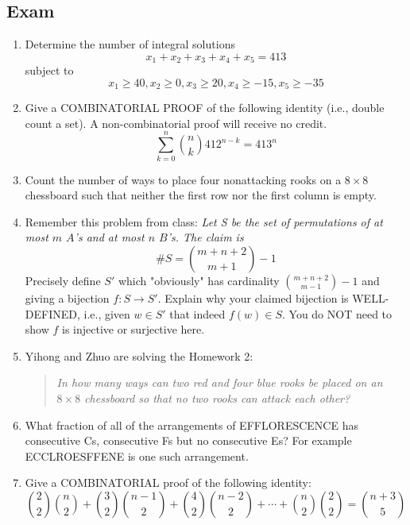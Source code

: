 \documentclass{report}
\begin{document}
{\subsection{Exam}

\begin{enumerate}
    \item Determine the number of integral solutions
          $$x_1 + x_2 + x_3 + x_4 + x_5 = 413$$ subject to
          $$x_1 \ge 40, x_2 \ge 0, x_3 \ge 20, x_4 \ge -15, x_5 \ge -35$$

    \item Give a COMBINATORIAL PROOF of the following identity (i.e.,
          double count a set). A non-combinatorial proof will receive no credit.
          $$\sum_{k=0}^n \binom{n}{k} 412^{n-k} = 413^n$$

    \item Count the number of ways to place four nonattacking rooks on a
          $8 \times 8$ chessboard such that neither the first row nor the first column is
          empty.

    \item Remember this problem from class: \textit{Let S be the set of permutations
              of at most $m$ $A$'s and at most $n$ $B$'s. The claim is}
          $$\#S = \binom{m+n+2}{m+1}-1 $$ Precisely define $S'$ which
          "obviously" has cardinality $\binom{m+n+2}{m-1}-1$ and giving a
          bijection $f: S \to S'$. Explain why your claimed bijection is
          WELL-DEFINED, i.e., given $w \in S'$ that indeed $f(w) \in S$.
          You do NOT need to show $f$ is injective or surjective here.

    \item Yihong and Zhuo are solving the Homework 2:

          \begin{quotation}
              \textit{In how many ways can two red and four blue rooks be
                  placed on an $8 \times 8$ chessboard so that no two rooks can
                  attack each other?}
          \end{quotation}

    \item What fraction of all of the arrangements of EFFLORESCENCE has
          consecutive Cs, consecutive Fs but no consecutive Es? For example
          ECCLROESFFENE is one such arrangement.

    \item Give a COMBINATORIAL proof of the following identity:
          $$\binom{2}{2}\binom{n}{2} + \binom{3}{2} \binom{n-1}{2} + \binom{4}{2}\binom{n-2}{2} + \cdots + \binom{n}{2} \binom{2}{2}=\binom{n+3}{5}$$
\end{enumerate}

}
\end{document}
